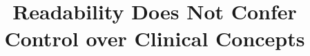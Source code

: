 \documentclass{article}
\title{Readability Does Not Confer Control over Clinical Concepts}
\begin{document}
\maketitle

\begin{abstract}

\end{abstract}












\clearpage
\appendix






\end{document}
